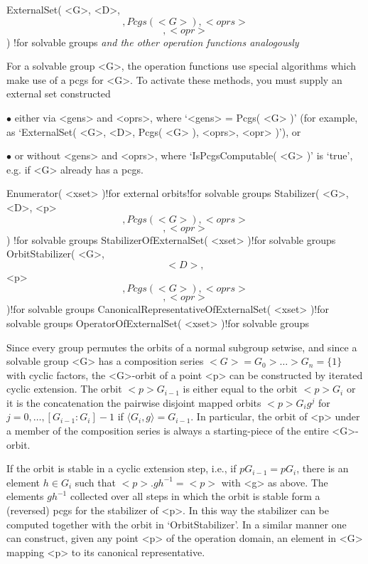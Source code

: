 
\>ExternalSet( <G>, <D>, \[, {Pcgs( <G> )}, <oprs> \] \[, <opr> \] )%
  !{for solvable groups}
\)\it and the other operation functions analogously

For a solvable group <G>, the  operation functions use special algorithms
which make use of  a pcgs for  <G>. To activate  these methods, you  must
supply an external set constructed
\beginlist
\item{$\bullet$}
  either via <gens>    and <oprs>, where `<gens>   =  Pcgs( <G>  )'  (for
  example, as `ExternalSet( <G>, <D>, Pcgs( <G> ), <oprs>, <opr> )'), or
\item{$\bullet$}
  or without   <gens> and  <oprs>, where   `IsPcgsComputable(  <G> )'  is
  `true', e.g. if <G> already has a pcgs.
\endlist

\>Enumerator( <xset> )!{for external orbits!for solvable groups}
\>Stabilizer( <G>, <D>, <p> \[, {Pcgs( <G> )}, <oprs> \] \[, <opr> \] )%
  !{for solvable groups}
\>StabilizerOfExternalSet( <xset> )!{for solvable groups}
\>OrbitStabilizer( <G>, \[ <D>, \] <p> \[, {Pcgs( <G> )}, <oprs> \] %
                   \[, <opr> \] )!{for solvable groups}
\>CanonicalRepresentativeOfExternalSet( <xset> )!{for solvable groups}
\>OperatorOfExternalSet( <xset> )!{for solvable groups}

\danger    Since every group permutes   the  orbits of  a normal subgroup
setwise, and since  a solvable group <G> has  a composition series $<G> =
G_0 > \ldots  > G_n=\{1\}$ with cyclic  factors, the <G>-orbit of a point
<p> can  be  constructed by iterated  cyclic   extension. The  orbit $<p>
G_{i-1}$ is   either  equal  to the   orbit   $<p>  G_i$  or it    is the
concatenation  the pairwise   disjoint  mapped orbits   $<p>  G_ig^j$ for
$j=0,\ldots, [G_{i-1}:G_i] - 1$ if  $\langle G_i, g\rangle = G_{i-1}$. In
particular, the orbit of <p> under a  member of the composition series is
always a starting-piece of the entire <G>-orbit.

If the orbit is stable in a cyclic extension step, i.e.,  if $p G_{i-1} =
p G_i$, there is an element $h\in G_i$ such that $<p>.gh^{-1} = <p>$ with
<g> as above.  The elements $gh^{-1}$  collected over all steps  in which
the orbit is stable form a (reversed) pcgs for  the stabilizer of <p>. In
this way  the stabilizer  can  be  computed together  with the  orbit  in
`OrbitStabilizer'. In a similar manner one can construct, given any point
<p> of  the operation   domain, an  element  in <G>  mapping <p>  to  its
canonical representative.


